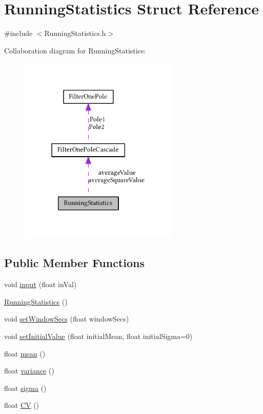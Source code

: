 \hypertarget{struct_running_statistics}{}\section{Running\+Statistics Struct Reference}
\label{struct_running_statistics}


{\ttfamily \#include $<$Running\+Statistics.\+h$>$}



Collaboration diagram for Running\+Statistics\+:\nopagebreak
\begin{figure}[H]
\begin{center}
\leavevmode
\includegraphics[width=217pt]{struct_running_statistics__coll__graph}
\end{center}
\end{figure}
\subsection*{Public Member Functions}
\begin{DoxyCompactItemize}
\item 
void \hyperlink{struct_running_statistics_af17e8c856b42305ecb02762730e12919}{input} (float in\+Val)
\item 
\hyperlink{struct_running_statistics_a5ba923774908f70a5827bcdc18f46477}{Running\+Statistics} ()
\item 
void \hyperlink{struct_running_statistics_a035fade92bd2f6fb0bbde8e4857c33f7}{set\+Window\+Secs} (float window\+Secs)
\item 
void \hyperlink{struct_running_statistics_a0695a069bf0f534f3a1987699bdfb7ea}{set\+Initial\+Value} (float initial\+Mean, float initial\+Sigma=0)
\item 
float \hyperlink{struct_running_statistics_a4001e3eb9ab7469014f541c16f0b30cd}{mean} ()
\item 
float \hyperlink{struct_running_statistics_a5401a1f86867e7de5987cbb14dc496df}{variance} ()
\item 
float \hyperlink{struct_running_statistics_a46189b5442a6bd5bbd303d239ca75a89}{sigma} ()
\item 
float \hyperlink{struct_running_statistics_a5de669afa689ee26e8c3c7286446ef54}{CV} ()
\end{DoxyCompactItemize}
